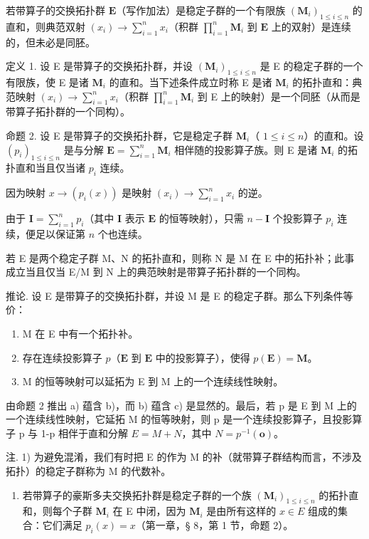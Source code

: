 若带算子的交换拓扑群 \(\mathbf{E}\)（写作加法）是稳定子群的一个有限族 \((\mathbf{M}_i)_{1 \leqslant i \leqslant n}\) 的直和，则典范双射 \((x_i) \to \sum_{i=1}^{n} x_i\)（积群 \(\prod_{i=1}^{n} \mathbf{M}_i\) 到 \(\mathbf{E}\) 上的双射）是连续的，但未必是同胚。

定义 1. 设 E 是带算子的交换拓扑群，并设 \((\mathbf{M}_i)_{1 \leqslant i \leqslant n}\) 是 E 的稳定子群的一个有限族，使 E 是诸 \(\mathbf{M}_i\) 的直和。当下述条件成立时称 E 是诸 \(\mathbf{M}_i\) 的拓扑直和：典范映射 \((x_i) \to \sum_{i=1}^{n} x_i\)（积群 \(\prod_{i=1}^{n} \mathbf{M}_i\) 到 E 上的映射）是一个同胚（从而是带算子拓扑群的一个同构）。

命题 2. 设 E 是带算子的交换拓扑群，它是稳定子群 \(\mathbf{M}_i\)（ \(1 \leqslant i \leqslant n\)）的直和。设 \((p_i)_{1 \leqslant i \leqslant n}\) 是与分解 \(\mathbf{E} = \sum_{i=1}^{n} \mathbf{M}_i\) 相伴随的投影算子族。则 E 是诸 \(\mathbf{M}_i\) 的拓扑直和当且仅当诸 \(p_i\) 连续。

因为映射 \(x \to (p_i(x))\) 是映射 \((x_i) \to \sum_{i=1}^{n} x_i\) 的逆。

由于 \(\mathbf{I} = \sum_{i=1}^{n} p_i\)（其中 \(\mathbf{I}\) 表示 \(\mathbf{E}\) 的恒等映射），只需 \(n - \mathbf{I}\) 个投影算子 \(p_i\) 连续，便足以保证第 \(n\) 个也连续。

若 E 是两个稳定子群 M、N 的拓扑直和，则称 N 是 M 在 E 中的拓扑补；此事成立当且仅当 E/M 到 N 上的典范映射是带算子拓扑群的一个同构。

推论. 设 E 是带算子的交换拓扑群，并设 M 是 E 的稳定子群。那么下列条件等价：

\begin{enumerate}
\def\labelenumi{\alph{enumi})}
\item
  M 在 E 中有一个拓扑补。
\item
  存在连续投影算子 \(p\)（\(\mathbf{E}\) 到 \(\mathbf{E}\) 中的投影算子），使得 \(p(\mathbf{E}) = \mathbf{M}\)。
\item
  M 的恒等映射可以延拓为 E 到 M 上的一个连续线性映射。
\end{enumerate}

由命题 2 推出 a) 蕴含 b)，而 b) 蕴含 c) 是显然的。最后，若 p 是 E 到 M 上的一个连续线性映射，它延拓 M 的恒等映射，则 p 是一个连续投影算子，且投影算子 p 与 1-p 相伴于直和分解 \(E = M + N\)，其中 \(N = p^{-1}(\mathbf{o})\)。

注. 1) 为避免混淆，我们有时把 E 的作为 M 的补（就带算子群结构而言，不涉及拓扑）的稳定子群称为 M 的代数补。

\begin{enumerate}
\def\labelenumi{\arabic{enumi})}
\setcounter{enumi}{1}
\tightlist
\item
  若带算子的豪斯多夫交换拓扑群是稳定子群的一个族 \((\mathbf{M}_i)_{1\leqslant i\leqslant n}\) 的拓扑直和，则每个子群 \(\mathbf{M}_i\) 在 E 中闭，因为 \(\mathbf{M}_i\) 是由所有这样的 \(x\in E\) 组成的集合：它们满足 \(p_i(x) = x\)（第一章，§ 8，第 1 节，命题 2）。
\end{enumerate}


